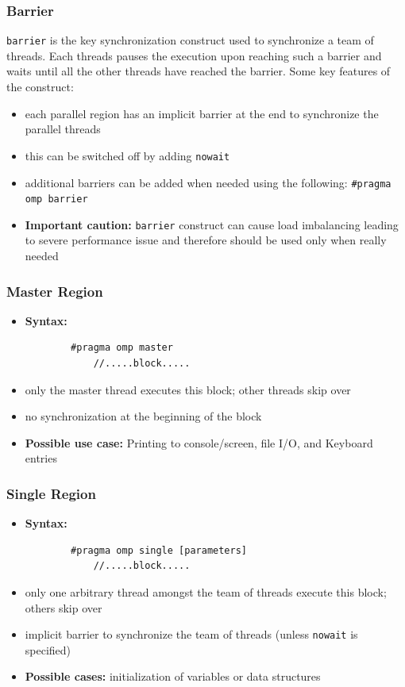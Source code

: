 \documentclass[12pt, a4paper]{report}
\begin{document}
\subsubsection{Barrier}
\verb$barrier$ is the key synchronization construct used to synchronize a team of threads. Each threads pauses the execution upon reaching such
a barrier and waits until all the other threads have reached the barrier.
Some key features of the construct:
\begin{itemize}
    \item each parallel region has an implicit barrier at the end to synchronize the parallel threads
    \item this can be switched off by adding \verb$nowait$
    \item additional barriers can be added when needed using the following: \verb$#pragma omp barrier$
    \item {\bfseries{Important caution:}} \verb$barrier$ construct can cause load imbalancing leading to severe performance issue and therefore
          should be used only when really needed
\end{itemize}

\subsubsection{Master Region}
\begin{itemize}
    \item {\bfseries{Syntax:}}
    \begin{verbatim}
        #pragma omp master
            //.....block.....
    \end{verbatim}
    \item only the master thread executes this block; other threads skip over
    \item no synchronization at the beginning of the block
    \item {\bfseries{Possible use case:}} Printing to console/screen, file I/O, and Keyboard entries
\end{itemize}

\subsubsection{Single Region}
\begin{itemize}
    \item {\bfseries{Syntax:}}
    \begin{verbatim}
        #pragma omp single [parameters]
            //.....block.....
    \end{verbatim}
    \item only one arbitrary thread amongst the team of threads execute this block; others skip over
    \item implicit barrier to synchronize the team of threads (unless \texttt{nowait} is specified)
    \item {\bfseries{Possible cases:}} initialization of variables or data structures
\end{itemize}
\end{document}
